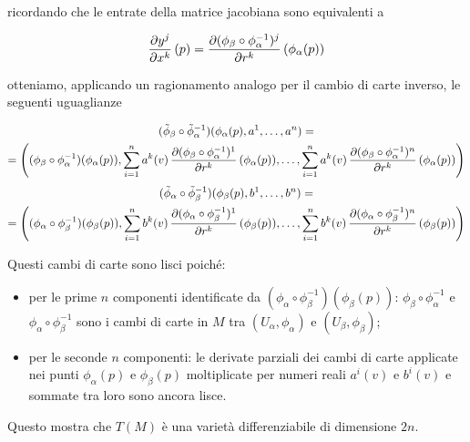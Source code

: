 ricordando che le entrate della matrice jacobiana sono equivalenti a

\begin{equation}
	\pdv{y^{j}}{x^{k}} \, (p) = \pdv{(\phi_{\beta} \circ \phi_{\alpha}^{-1})^{j}}{r^{k}} \, (\phi_{\alpha}(p))
\end{equation}

otteniamo, applicando un ragionamento analogo per il cambio di carte inverso, le seguenti uguaglianze

\begin{multline}
	(\tilde{\phi}_{\beta} \circ \tilde{\phi}_{\alpha}^{-1}) (\phi_{\alpha}(p), a^{1},\dots,a^{n}) = \\
	= \left( (\phi_{\beta} \circ \phi_{\alpha}^{-1})(\phi_{\alpha}(p)), \sum_{i=1}^{n} a^{k}(v) \, \pdv{(\phi_{\beta} \circ \phi_{\alpha}^{-1})^{1}}{r^{k}} \, (\phi_{\alpha}(p)) ,\dots, \sum_{i=1}^{n} a^{k}(v) \, \pdv{(\phi_{\beta} \circ \phi_{\alpha}^{-1})^{n}}{r^{k}} \, (\phi_{\alpha}(p)) \right)
\end{multline}
%
\begin{multline}
	(\tilde{\phi}_{\alpha} \circ \tilde{\phi}_{\beta}^{-1}) (\phi_{\beta}(p), b^{1},\dots,b^{n}) = \\
	= \left( (\phi_{\alpha} \circ \phi_{\beta}^{-1})(\phi_{\beta}(p)), \sum_{i=1}^{n} b^{k}(v) \, \pdv{(\phi_{\alpha} \circ \phi_{\beta}^{-1})^{1}}{r^{k}} \, (\phi_{\beta}(p)) ,\dots, \sum_{i=1}^{n} b^{k}(v) \, \pdv{(\phi_{\alpha} \circ \phi_{\beta}^{-1})^{n}}{r^{k}} \, (\phi_{\beta}(p)) \right)
\end{multline}

Questi cambi di carte sono lisci poiché:

\begin{itemize}
	\item per le prime $ n $ componenti identificate da $ (\phi_{\alpha} \circ \phi_{\beta}^{-1})(\phi_{\beta}(p)) $: $ \phi_{\beta} \circ \phi_{\alpha}^{-1} $ e $ \phi_{\alpha} \circ \phi_{\beta}^{-1} $ sono i cambi di carte in $ M $ tra $ (U_{\alpha},\phi_{\alpha}) $ e $ (U_{\beta},\phi_{\beta}) $;
	
	\item per le seconde $ n $ componenti: le derivate parziali dei cambi di carte applicate nei punti $ \phi_{\alpha}(p) $ e $ \phi_{\beta}(p) $ moltiplicate per numeri reali $ a^{i}(v) $ e $ b^{i}(v) $ e sommate tra loro sono ancora lisce.
\end{itemize}

Questo mostra che $ T(M) $ è una varietà differenziabile di dimensione $ 2n $.

